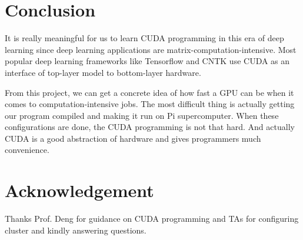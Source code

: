 \documentclass{article}
\begin{document}
\section{Conclusion}
It is really meaningful for us to learn CUDA programming in this era of deep learning since deep learning applications are matrix-computation-intensive. Most popular deep learning frameworks like Tensorflow and CNTK use CUDA as an interface of top-layer model to bottom-layer hardware.

From this project, we can get a concrete idea of how fast a GPU can be when it comes to computation-intensive jobs. The most difficult thing is actually getting our program compiled and making it run on Pi supercomputer. When these configurations are done, the CUDA programming is not that hard. And actually CUDA is a good abstraction of hardware and gives programmers much convenience.



\section*{Acknowledgement}
Thanks Prof. Deng for guidance on CUDA programming and TAs for configuring cluster and kindly answering questions.
\end{document}
